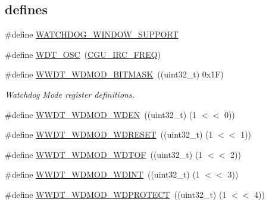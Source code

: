 \subsection*{\textquotesingle{}defines\textquotesingle{}}
\begin{DoxyCompactItemize}
\item 
\#define \hyperlink{group___w_w_d_t__18_x_x__43_x_x_gafd5360b2cfcfe4271a608b6c90bcea5f}{W\+A\+T\+C\+H\+D\+O\+G\+\_\+\+W\+I\+N\+D\+O\+W\+\_\+\+S\+U\+P\+P\+O\+RT}
\item 
\#define \hyperlink{group___w_w_d_t__18_x_x__43_x_x_ga628282c7bf5c28d5a859e4915c62b643}{W\+D\+T\+\_\+\+O\+SC}~(\hyperlink{group___c_l_o_c_k__18_x_x__43_x_x_gaec3e2b28e900580cc4dc72034f7371fd}{C\+G\+U\+\_\+\+I\+R\+C\+\_\+\+F\+R\+EQ})
\item 
\#define \hyperlink{group___w_w_d_t__18_x_x__43_x_x_gac9ba0cf06012012875985842cabb5a11}{W\+W\+D\+T\+\_\+\+W\+D\+M\+O\+D\+\_\+\+B\+I\+T\+M\+A\+SK}~((uint32\+\_\+t) 0x1\+F)
\begin{DoxyCompactList}\small\item\em Watchdog Mode register definitions. \end{DoxyCompactList}\item 
\#define \hyperlink{group___w_w_d_t__18_x_x__43_x_x_ga9c4d839b554cf8919c76bd613745967f}{W\+W\+D\+T\+\_\+\+W\+D\+M\+O\+D\+\_\+\+W\+D\+EN}~((uint32\+\_\+t) (1 $<$$<$ 0))
\item 
\#define \hyperlink{group___w_w_d_t__18_x_x__43_x_x_gaa6b03ad5df847bc2241c0ea1eefd9431}{W\+W\+D\+T\+\_\+\+W\+D\+M\+O\+D\+\_\+\+W\+D\+R\+E\+S\+ET}~((uint32\+\_\+t) (1 $<$$<$ 1))
\item 
\#define \hyperlink{group___w_w_d_t__18_x_x__43_x_x_ga9379872b1e184e20abf74f1abbdd8cb9}{W\+W\+D\+T\+\_\+\+W\+D\+M\+O\+D\+\_\+\+W\+D\+T\+OF}~((uint32\+\_\+t) (1 $<$$<$ 2))
\item 
\#define \hyperlink{group___w_w_d_t__18_x_x__43_x_x_ga6530623c6535d2c7b65c9b50d320c5f1}{W\+W\+D\+T\+\_\+\+W\+D\+M\+O\+D\+\_\+\+W\+D\+I\+NT}~((uint32\+\_\+t) (1 $<$$<$ 3))
\item 
\#define \hyperlink{group___w_w_d_t__18_x_x__43_x_x_gac44132c9f40915e405e3cfedc2599586}{W\+W\+D\+T\+\_\+\+W\+D\+M\+O\+D\+\_\+\+W\+D\+P\+R\+O\+T\+E\+CT}~((uint32\+\_\+t) (1 $<$$<$ 4))
\end{DoxyCompactItemize}
